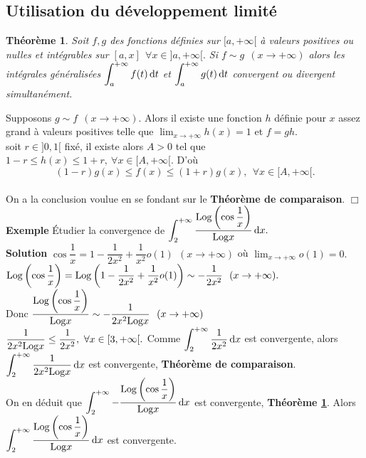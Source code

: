 \documentclass[11pt, a4paper]{book}
\newtheorem{teo}{Th\'eor\`eme}[section]
\newenvironment{pr}{\noindent {\bf Preuve} \noindent} {\hfill $\Box$\vskip 5mm}
\begin{document}
\subsection{Utilisation du d\'eveloppement limit\'e}
\begin{teo} \label{teo3.2.1} Soit $f,g$ des fonctions d\'efinies sur $[a,+\infty[$ \`a valeurs positives ou nulles et int\'egrables sur $[a,x] ~~\forall x\in ]a,+\infty[.$ Si $f\sim g~~(x\rightarrow +\infty)$ alors les int\'egrales g\'en\'eralis\'ees ${\displaystyle \int_a^{+\infty} f(t)\,\mathrm{d} t}$ et ${\displaystyle \int_a^{+\infty} g(t)\,\mathrm{d} t}$ convergent ou divergent simultan\'ement.
\end{teo}
\begin{pr}\quad
Supposons $g\sim f~~(x\rightarrow+\infty)$. Alors il existe une fonction $h$ d\'efinie pour $x$ assez grand \`a valeurs positives telle que ${\displaystyle \lim_{x\rightarrow+\infty}h(x)=1}$ et $f=gh.$\\
soit $r \in ]0,1[$ fix\'e, il existe alors $A>0$ tel que $1-r\leq h(x)\leq 1+r,~\forall x\in [A,+\infty[.$ D'o\`u $$(1-r)g(x)\leq f(x)\leq (1+r)g(x),~~ \forall x\in [A,+\infty[.$$ \\
On a la conclusion voulue en se fondant sur le \textbf{Th\'eor\`eme de comparaison}.
\end{pr}
\textbf{Exemple}\quad 
\'Etudier la convergence de ${\displaystyle \int_2^{+\infty} \dfrac{\mathrm{Log} \left(\cos \dfrac{1}{x}\right)}{\mathrm{Log} x}\,\mathrm{d} x.}$ \\ \textbf{Solution\quad} $\cos \dfrac{1}{x}=1-\dfrac{1}{2x^2}+\dfrac{1}{x^2}o(1)~~(x\rightarrow+\infty)$ o\`u ${\displaystyle \lim_{x\rightarrow+\infty}o(1)=0.}$\\
$\mathrm{Log} \left(\cos \dfrac{1}{x}\right)=\mathrm{Log}\left(1-\dfrac{1}{2x^2}+\dfrac{1}{x^2}o(1)\right)\sim -\dfrac{1}{2x^2}~~(x\rightarrow+\infty).$ \\ Donc $ \dfrac{\mathrm{Log} \left(\cos \dfrac{1}{x}\right)}{\mathrm{Log} x}\sim -\dfrac{1}{2x^2 \mathrm{Log} x}~~(x\rightarrow+\infty)$\\
$\dfrac{1}{2x^2 \mathrm{Log} x}\leq \dfrac{1}{2x^2},~\forall x\in [3,+\infty[.$ Comme ${\displaystyle \int_2^{+\infty} \dfrac{1}{2x^2}\,\mathrm{d} x}$ est convergente, alors ${\displaystyle \int_2^{+\infty} \dfrac{1}{2x^2 \mathrm{Log} x}\,\mathrm{d} x}$ est convergente, \textbf{Th\'eor\`eme de comparaison}.\\
On en d\'eduit que ${\displaystyle \int_2^{+\infty}-\dfrac{\mathrm{Log} \left(\cos \dfrac{1}{x}\right)}{\mathrm{Log} x}\,\mathrm{d} x}$ est convergente, \textbf{Th\'eor\`eme \ref{teo3.2.1}}. Alors ${\displaystyle \int_2^{+\infty} \dfrac{\mathrm{Log} \left(\cos \dfrac{1}{x}\right)}{\mathrm{Log} x}\,\mathrm{d} x}$ est convergente.
\end{document}
